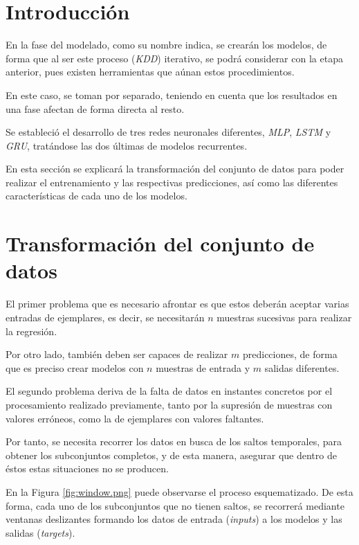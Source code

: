 
\section{Introducción}
En la fase del modelado, como su nombre indica, se crearán los modelos, de forma que al ser
este proceso (\textit{KDD}) iterativo, se podrá considerar con la etapa anterior, pues existen
herramientas que aúnan estos procedimientos.

En este caso, se toman por separado, teniendo en cuenta que los resultados en una
fase afectan de forma directa al resto.

Se estableció el desarrollo de tres redes neuronales diferentes, \textit{MLP}, 
\textit{LSTM} y \textit{GRU}, tratándose las dos últimas de modelos recurrentes.

En esta sección se explicará la transformación del conjunto de datos para poder
realizar el entrenamiento y las respectivas predicciones, así como
las diferentes características de cada uno de los modelos.

\section{Transformación del conjunto de datos}
El primer problema que es necesario afrontar es que estos deberán aceptar varias
entradas de ejemplares, es decir, se necesitarán \(n\) muestras sucesivas para realizar la
regresión.

Por otro lado, también deben ser capaces de realizar \(m\) predicciones, de forma que 
es preciso crear modelos con \(n\) muestras de entrada y \(m\) salidas diferentes.

El segundo problema deriva de la falta de datos en instantes concretos por el procesamiento
realizado previamente, tanto por la supresión de muestras con valores erróneos, como
la de ejemplares con valores faltantes.

Por tanto, se necesita recorrer los datos en busca de los saltos temporales, para obtener
los subconjuntos completos, y de esta manera, asegurar que dentro de éstos estas situaciones
no se producen.


En la Figura \ref{fig:window.png} puede observarse el proceso esquematizado.
De esta forma, cada uno de los subconjuntos que no tienen saltos, se recorrerá 
mediante ventanas deslizantes formando los datos de entrada (\textit{inputs}) a los 
modelos y las salidas (\textit{targets}).

